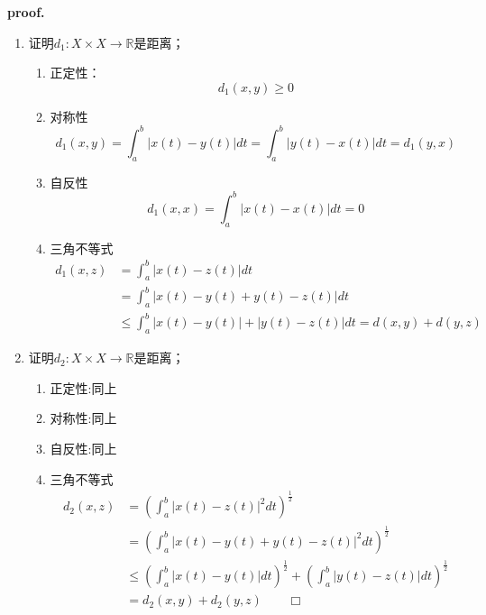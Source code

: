 \textbf{proof.} 
    \begin{enumerate}[itemindent=2em]
        \item 证明$d_1:X\times X\rightarrow \mathbb{R}$是距离；
        
        \begin{enumerate}[itemindent=2em]
            \item 正定性：
            \begin{equation}
                d_1(x,y)\geqslant 0
            \end{equation}
            \item 对称性
            \begin{equation}
                d_1(x,y)=\int_{a}^{b}|x(t)-y(t)|dt=\int_{a}^{b}|y(t)-x(t)|dt=d_1(y,x)
            \end{equation}
            \item 自反性
            \begin{equation}
                d_1(x,x)=\int_{a}^{b}|x(t)-x(t)|dt=0
            \end{equation}
            \item 三角不等式
            \begin{equation}
                \begin{aligned}
                    d_1(x,z)&=\int_{a}^{b}|x(t)-z(t)|dt\\
                    &=\int_{a}^{b}|x(t)-y(t)+y(t)-z(t)|dt\\
                    &\leqslant \int_{a}^{b}|x(t)-y(t)|+|y(t)-z(t)|dt=d(x,y)+d(y,z)
                \end{aligned}
            \end{equation}
        \end{enumerate}

        \item 证明$d_2:X\times X\rightarrow \mathbb{R}$是距离；
        
        \begin{enumerate}[itemindent=2em]
            \item 正定性:同上
            \item 对称性:同上
            \item 自反性:同上
            \item 三角不等式
            \begin{equation}
                \begin{aligned}
                    d_2(x,z)&=\left(\int_{a}^{b}|x(t)-z(t)|^2dt\right)^{\frac{1}{2}}\\
                    &= \left(\int_{a}^{b}|x(t)-y(t)+y(t)-z(t)|^2dt\right)^{\frac{1}{2}}\\
                    &\leqslant \left(\int_{a}^{b}|x(t)-y(t)|dt\right)^{\frac{1}{2}}+\left(\int_{a}^{b}|y(t)-z(t)|dt\right)^{\frac{1}{2}}\\
                    &=d_2(x,y)+d_2(y,z)\ \ \ \ \ \ \  \ \ \Box
                \end{aligned}
            \end{equation}
        \end{enumerate}

    \end{enumerate}

